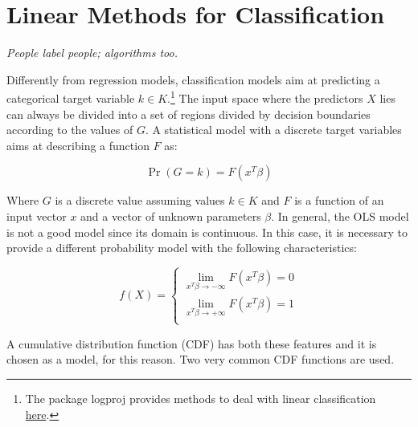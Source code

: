 \chapter{Linear Methods for Classification} \label{chapLinearClassification}

\epigraph{\textit{People label people; algorithms too.}}{}

Differently from regression models, classification models aim at predicting a categorical target variable $k\in K$.\footnote{The package logproj provides methods to deal with linear classification \href{https://github.com/aletuf93/logproj/blob/master/logproj/M_learningMethod/linear_models.py}{here}.}  The input space where the predictors $X$ lies can always be divided into a set of regions divided by decision boundaries according to the values of $G$. A statistical model with a discrete target variables aims at describing a function $F$ as:

\begin{equation}
\Pr{(G=k)}=F(x^T\beta)
\label{eq_classification1}
\end{equation}

Where $G$ is a discrete value assuming values $k\in K$ and $F$ is a function of an input vector $x$ and a vector of unknown parameters $\beta$. In general, the OLS model is not a good model since its domain is continuous. In this case, it is necessary to provide a different probability model with the following characteristics:

\begin{equation}
f(X)=\left\{
                \begin{array}{ll}
                  \lim_{x^T\beta \to -\infty} F\left(x^T\beta\right)=0 \\
                  \lim_{x^T\beta \to +\infty} F\left(x^T\beta\right)=1 \\
                \end{array}
              \right.
\label{eq_classification2}
\end{equation}

A cumulative distribution function (CDF) has both these features and it is chosen as a model, for this reason. Two very common CDF functions are used.

